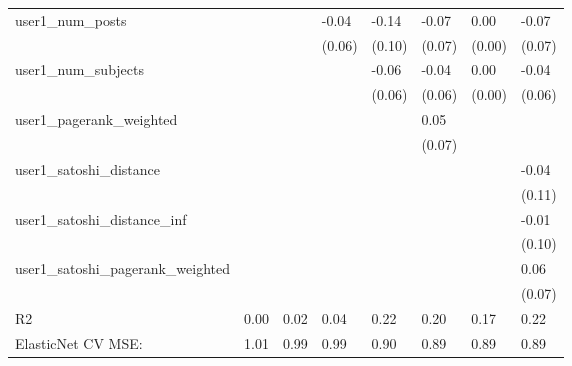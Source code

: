 \begin{table}
\begin{center}
\begin{tabular}{llllllll}
user1_num_posts                                           &          &         & -0.04   & -0.14   & -0.07    & 0.00               & -0.07      \\
                                                          &          &         & (0.06)  & (0.10)  & (0.07)   & (0.00)             & (0.07)     \\
user1_num_subjects                                        &          &         &         & -0.06   & -0.04    & 0.00               & -0.04      \\
                                                          &          &         &         & (0.06)  & (0.06)   & (0.00)             & (0.06)     \\
user1_pagerank_weighted                                   &          &         &         &         & 0.05     &                    &            \\
                                                          &          &         &         &         & (0.07)   &                    &            \\
user1_satoshi_distance                                    &          &         &         &         &          &                    & -0.04      \\
                                                          &          &         &         &         &          &                    & (0.11)     \\
user1_satoshi_distance_inf                                &          &         &         &         &          &                    & -0.01      \\
                                                          &          &         &         &         &          &                    & (0.10)     \\
user1_satoshi_pagerank_weighted                           &          &         &         &         &          &                    & 0.06       \\
                                                          &          &         &         &         &          &                    & (0.07)     \\
R2                                                        & 0.00     & 0.02    & 0.04    & 0.22    & 0.20     & 0.17               & 0.22       \\
ElasticNet CV MSE:                                        & 1.01     & 0.99    & 0.99    & 0.90    & 0.89     & 0.89               & 0.89       \\

\end{tabular}
\end{center}
\end{table}
